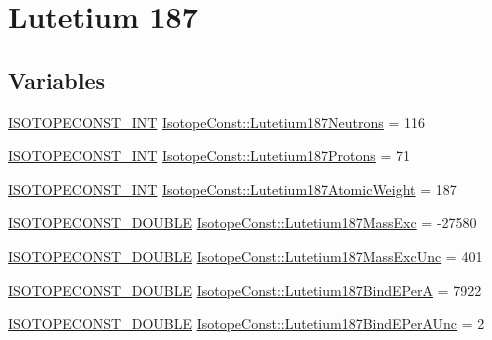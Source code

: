 \hypertarget{group___isotope_const-_lutetium-_lu187}{}\section{Lutetium 187}
\label{group___isotope_const-_lutetium-_lu187}
\subsection*{Variables}
\begin{DoxyCompactItemize}
\item 
\mbox{\hyperlink{group___isotope_const-_macros_ga5f18360b3e99483a35c32d789e62621c}{I\+S\+O\+T\+O\+P\+E\+C\+O\+N\+S\+T\+\_\+\+I\+NT}} \mbox{\hyperlink{group___isotope_const-_lutetium-_lu187_gaa7b2461f9d688051e313d51e255a5712}{Isotope\+Const\+::\+Lutetium187\+Neutrons}} = 116
\item 
\mbox{\hyperlink{group___isotope_const-_macros_ga5f18360b3e99483a35c32d789e62621c}{I\+S\+O\+T\+O\+P\+E\+C\+O\+N\+S\+T\+\_\+\+I\+NT}} \mbox{\hyperlink{group___isotope_const-_lutetium-_lu187_ga55624b3261ca8555012f47bcacd0ffc9}{Isotope\+Const\+::\+Lutetium187\+Protons}} = 71
\item 
\mbox{\hyperlink{group___isotope_const-_macros_ga5f18360b3e99483a35c32d789e62621c}{I\+S\+O\+T\+O\+P\+E\+C\+O\+N\+S\+T\+\_\+\+I\+NT}} \mbox{\hyperlink{group___isotope_const-_lutetium-_lu187_gab57b782c923ea7acf55cb8e832d8a2c1}{Isotope\+Const\+::\+Lutetium187\+Atomic\+Weight}} = 187
\item 
\mbox{\hyperlink{group___isotope_const-_macros_ga8f45a7272ce02c0b4c65c44636ed719a}{I\+S\+O\+T\+O\+P\+E\+C\+O\+N\+S\+T\+\_\+\+D\+O\+U\+B\+LE}} \mbox{\hyperlink{group___isotope_const-_lutetium-_lu187_ga43fdd9238fbc6f70adc534c573bbe2ad}{Isotope\+Const\+::\+Lutetium187\+Mass\+Exc}} = -\/27580
\item 
\mbox{\hyperlink{group___isotope_const-_macros_ga8f45a7272ce02c0b4c65c44636ed719a}{I\+S\+O\+T\+O\+P\+E\+C\+O\+N\+S\+T\+\_\+\+D\+O\+U\+B\+LE}} \mbox{\hyperlink{group___isotope_const-_lutetium-_lu187_ga46d4e8f44bb2288f4cf1a7f3af1999b1}{Isotope\+Const\+::\+Lutetium187\+Mass\+Exc\+Unc}} = 401
\item 
\mbox{\hyperlink{group___isotope_const-_macros_ga8f45a7272ce02c0b4c65c44636ed719a}{I\+S\+O\+T\+O\+P\+E\+C\+O\+N\+S\+T\+\_\+\+D\+O\+U\+B\+LE}} \mbox{\hyperlink{group___isotope_const-_lutetium-_lu187_gad9aedfd91faed7eeed7bc3c2d702c86b}{Isotope\+Const\+::\+Lutetium187\+Bind\+E\+PerA}} = 7922
\item 
\mbox{\hyperlink{group___isotope_const-_macros_ga8f45a7272ce02c0b4c65c44636ed719a}{I\+S\+O\+T\+O\+P\+E\+C\+O\+N\+S\+T\+\_\+\+D\+O\+U\+B\+LE}} \mbox{\hyperlink{group___isotope_const-_lutetium-_lu187_ga6b13d532d29271bdfe2e027b88b30791}{Isotope\+Const\+::\+Lutetium187\+Bind\+E\+Per\+A\+Unc}} = 2

\end{DoxyCompactItemize}
